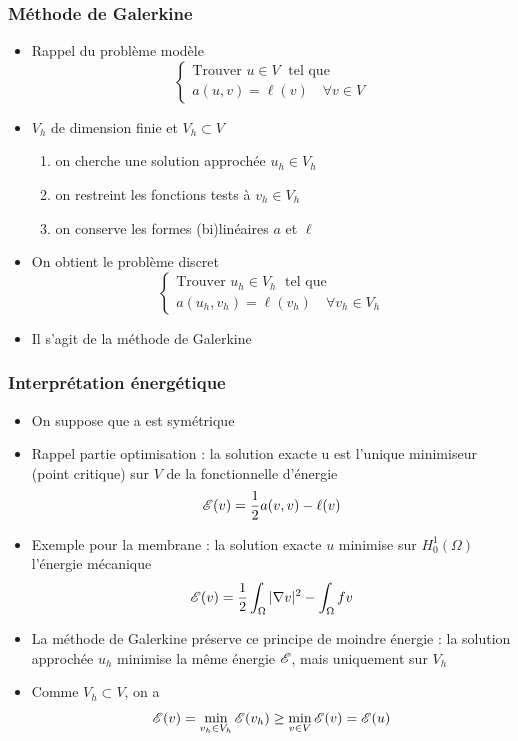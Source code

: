 \documentclass{beamer}
\begin{document}
\begin{frame}
\frametitle{Méthode de Galerkine}
\begin{itemize}
\item Rappel du problème modèle
\begin{equation}
\left\{
\begin{array}{l}
\mbox{Trouver } u \in V\;\mbox{ tel que }\\
a(u,v)= \ell(v) \quad \forall v\in V
\end{array}
\right.
\label{probAbst1}
\end{equation}
\item $V_h$ de dimension finie et $V_h \subset V$ 
\begin{enumerate}
\item on cherche une solution approchée $u_h \in V_h$
\item on restreint les fonctions tests à $v_h \in V_h$
\item on conserve les formes (bi)linéaires $a$ et $\ell$ 
\end{enumerate}
\item On obtient le problème discret
\begin{equation}
\left\{
\begin{array}{l}
\mbox{Trouver } u_h \in V_h\;\mbox{ tel que }\\
a(u_h,v_h)= \ell(v_h) \quad \forall v_h\in V_h
\end{array}
\right.
\label{Galerkine}
\end{equation}
\item Il s'agit de la méthode de Galerkine
\end{itemize}
\end{frame}
\begin{frame}
\frametitle{Interprétation énergétique}

\begin{itemize}
\item On suppose que a est symétrique
\item Rappel partie optimisation : la solution exacte u est l'unique minimiseur
(point critique) sur $V$ de la fonctionnelle d'énergie
\[{\cal E}(v)=\frac 12 a(v,v)-\ell(v)\]
\item Exemple pour la membrane : la solution exacte $u$ minimise sur $H^1_0(\Omega)$ l'énergie mécanique
\[{\cal E}(v)=\frac 12 \int_{\Omega}|\nabla v|^2-\int_{\Omega}f v\]
\item La méthode de Galerkine préserve ce principe de moindre énergie : la solution
approchée $u_h$ minimise la même énergie ${\cal E}$, mais uniquement sur $V_h$
\item Comme $V_h \subset V$, on a
\[{\cal E}(v)=\min_{v_h\in V_h} {\cal E}(v_h)\geq \min_{v\in V} {\cal E}(v)={\cal E}(u)\]
\end{itemize}
\end{frame}
\end{document}
